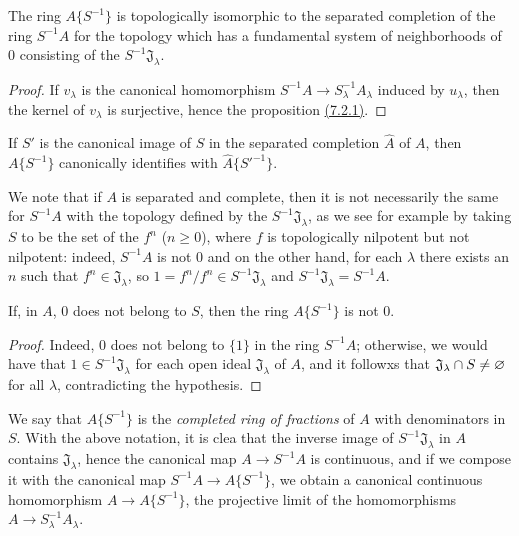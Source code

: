 \begin{prop}[7.6.2]
\label{prop-0.7.6.2}
The ring $A\{S^{-1}\}$ is topologically isomorphic to the separated completion of the ring
$S^{-1}A$ for the topology which has a fundamental system of neighborhoods of $0$ consisting of
the $S^{-1}\mathfrak{J}_\lambda$.
\end{prop}

\begin{proof}
\label{proof-prop-0.7.6.2}
If $v_\lambda$ is the canonical homomorphism $S^{-1}A\to S_\lambda^{-1}A_\lambda$ induced
by $u_\lambda$, then the kernel of $v_\lambda$ is surjective, hence the proposition
\hyperref[env-0.7.2.1]{(7.2.1)}.
\end{proof}

\begin{cor}[7.6.3]
\label{cor-0.7.6.3}
If $S'$ is the canonical image of $S$ in the separated completion $\widehat{A}$ of $A$, then
$A\{S^{-1}\}$ canonically identifies with $\widehat{A}\{{S'}^{-1}\}$.
\end{cor}

We note that if $A$ is separated and complete, then it is not necessarily the same for
$S^{-1}A$ with the topology defined by the $S^{-1}\mathfrak{J}_\lambda$, as we see for example
by taking $S$ to be the set of the $f^n$ ($n\geqslant 0$), where $f$ is topologically nilpotent
but not nilpotent: indeed, $S^{-1}A$ is not $0$ and on the other hand, for each $\lambda$ there
exists an $n$ such that $f^n\in\mathfrak{J}_\lambda$, so $1=f^n/f^n\in S^{-1}\mathfrak{J}_\lambda$
and $S^{-1}\mathfrak{J}_\lambda=S^{-1}A$.

\begin{cor}[7.6.4]
\label{cor-0.7.6.4}
If, in $A$, $0$ does not belong to $S$, then the ring $A\{S^{-1}\}$ is not $0$.
\end{cor}

\begin{proof}
\label{proof-cor-0.7.6.4}
Indeed, $0$ does not belong to $\{1\}$ in the ring $S^{-1}A$; otherwise, we would have that
$1\in S^{-1}\mathfrak{J}_\lambda$ for each open ideal $\mathfrak{J}_\lambda$ of $A$, and it
followxs that $\mathfrak{J}_\lambda\cap S\neq\varnothing$ for all $\lambda$, contradicting the
hypothesis.
\end{proof}

\begin{env}[7.6.5]
\label{env-0.7.6.5}
We say that $A\{S^{-1}\}$ is the {\em completed ring of fractions} of $A$ with denominators
in $S$. With the above notation, it is clea that the inverse image of $S^{-1}\mathfrak{J}_\lambda$
in $A$ contains $\mathfrak{J}_\lambda$, hence the canonical map $A\to S^{-1}A$ is continuous, and if
we compose it with the canonical map $S^{-1}A\to A\{S^{-1}\}$, we obtain a canonical continuous
homomorphism $A\to A\{S^{-1}\}$, the projective limit of the homomorphisms
$A\to S_\lambda^{-1}A_\lambda$.
\end{env}

